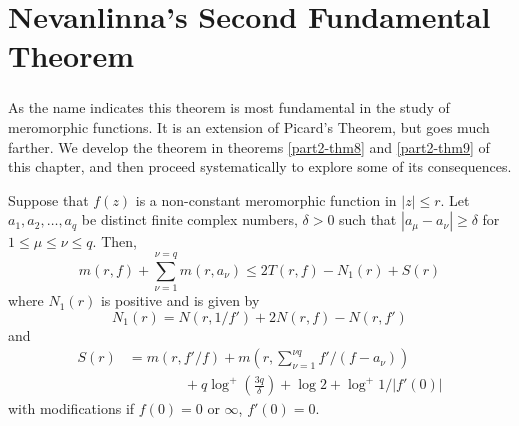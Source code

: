 \chapter{Nevanlinna's Second Fundamental Theorem}

\setcounter{section}{2}
\setcounter{subsection}{0}
\subsection{}\label{part2-sec2.1}\pageoriginale

As the name indicates this theorem is most fundamental in the study of
meromorphic functions. It is an extension of Picard's Theorem, but
goes much farther. We develop the theorem in theorems \ref{part2-thm8}
and \ref{part2-thm9} of this chapter, and then proceed systematically
to explore some of its consequences.

\begin{thm}\label{part2-thm8}
Suppose that $f(z)$ is a non-constant meromorphic function in $|z|\leq
r$. Let $a_{1},a_{2},\ldots,a_{q}$ be distinct finite complex numbers,
$\delta>0$ such that $|a_{\mu}-a_{\nu}|\geq\delta$ for $1\leq \mu\leq
\nu\leq q$. Then,
$$
m(r,f)+\sum^{\nu=q}_{\nu=1}m(r,a_{\nu})\leq 2T(r,f)-N_{1}(r)+S(r)
$$
where $N_{1}(r)$ is positive and is given by
$$
N_{1}(r)=N(r,1/f')+2N(r,f)-N(r,f')
$$
and
\begin{align*}
S(r)&=m(r,f'/f)+m\left(r,\sum^{\nu
  q}_{\nu=1}f'/(f-a_{\nu})\right)\\
&\qquad\qquad{}+q\log^{+}\left(\frac{3q}{\delta}\right)+\log
2+\log^{+}1/|f'(0)| 
\end{align*}
with modifications if $f(0)=0$ or $\infty$, $f'(0)=0$.
\end{thm}


